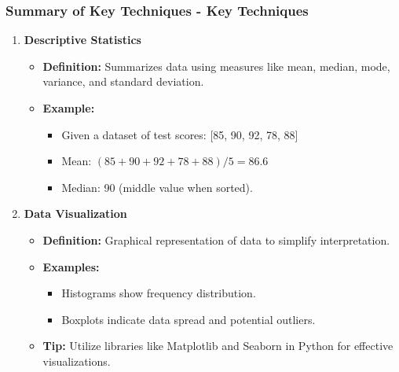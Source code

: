 \documentclass[aspectratio=169]{beamer}
\begin{document}
\begin{frame}[fragile]
    \frametitle{Summary of Key Techniques - Key Techniques}
    \begin{enumerate}
        \item \textbf{Descriptive Statistics}
            \begin{itemize}
                \item \textbf{Definition:} Summarizes data using measures like mean, median, mode, variance, and standard deviation.
                \item \textbf{Example:} 
                \begin{itemize}
                    \item Given a dataset of test scores: [85, 90, 92, 78, 88]
                    \item Mean: \((85 + 90 + 92 + 78 + 88) / 5 = 86.6\)
                    \item Median: 90 (middle value when sorted).
                \end{itemize}
            \end{itemize}
        
        \item \textbf{Data Visualization}
            \begin{itemize}
                \item \textbf{Definition:} Graphical representation of data to simplify interpretation.
                \item \textbf{Examples:} 
                \begin{itemize}
                    \item Histograms show frequency distribution.
                    \item Boxplots indicate data spread and potential outliers.
                \end{itemize}
                \item \textbf{Tip:} Utilize libraries like Matplotlib and Seaborn in Python for effective visualizations.
            \end{itemize}
    \end{enumerate}
\end{frame}
\end{document}
